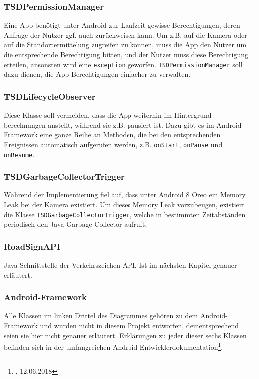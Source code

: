 \documentclass[12pt,a4paper,ngerman,enabledeprecatedfontcommands]{scrreprt}
\begin{document}
\subsubsection*{TSDPermissionManager}
Eine \gls{App} benötigt unter Android zur Laufzeit gewisse Berechtigungen, deren Anfrage der \gls{Nutzer} ggf. auch zurückweisen kann. Um z.B. auf die Kamera oder auf die Standortermittelung zugreifen zu können, muss die \gls{App} den Nutzer um die entsprechende Berechtigung bitten, und der Nutzer muss diese Berechtigung erteilen, ansonsten wird eine \texttt{exception} geworfen. \texttt{TSDPermissionManager} soll dazu dienen, die \gls{App}-Berechtigungen einfacher zu verwalten. \\

\subsubsection*{TSDLifecycleObserver}
Diese Klasse soll vermeiden, dass die \gls{App} weiterhin im Hintergrund berechnungen anstellt, während sie z.B. pausiert ist. Dazu gibt es im Android-Framework eine ganze Reihe an Methoden, die bei den entsprechenden Ereignissen automatisch aufgerufen werden, z.B. \texttt{onStart}, \texttt{onPause} und \texttt{onResume}.\\

\subsubsection*{TSDGarbageCollectorTrigger}
Während der Implementierung fiel auf, dass unter Android 8 \glqq{}Oreo\grqq{} ein Memory Leak bei der Kamera existiert. Um dieses Memory Leak vorzubeugen, existiert die Klasse \texttt{TSDGarbageCollectorTrigger}, welche in bestimmten Zeitabständen periodisch den Java-Garbage-Collector aufruft.\\

\subsubsection*{RoadSignAPI}
Java-Schnittstelle der \gls{Verkehrszeichen-API}. Ist im nächsten Kapitel genauer erläutert.\\

\subsubsection*{Android-Framework}
Alle Klassen im linken Drittel des Diagrammes gehören zu dem Android-Framework und wurden nicht in diesem Projekt entworfen, dementsprechend seien sie hier nicht genauer erläutert. Erklärungen zu jeder dieser sechs Klassen befinden sich in der umfangreichen Android-Entwicklerdokumentation\footnote{, 12.06.2018}.\\
\end{document}
